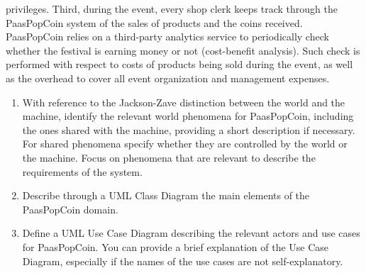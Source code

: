 \documentclass[12pt, a4paper]{report}
\begin{document}
        privileges. Third, during the event, every shop clerk keeps track through the PaasPopCoin system of the sales of products and the coins received. PaasPopCoin relies on a 
        third-party analytics service to periodically check whether the festival is earning money or not (cost-benefit analysis). Such check is performed with respect to costs of 
        products being sold during the event, as well as the overhead to cover all event organization and management expenses. 
        \begin{enumerate}
            \item With reference to the Jackson-Zave distinction between the world and the machine, identify the relevant world phenomena for PaasPopCoin, including the ones shared 
                with the machine, providing a short description if necessary. For shared phenomena specify whether they are controlled by the world or the machine. Focus on phenomena 
                that are relevant to describe the requirements of the system.
            \item Describe through a UML Class Diagram the main elements of the PaasPopCoin domain. 
            \item Define a UML Use Case Diagram describing the relevant actors and use cases for PaasPopCoin. You can provide a brief explanation of the Use Case Diagram, especially 
                if the names of the use cases are not self-explanatory.
        \end{enumerate}
\end{document}
